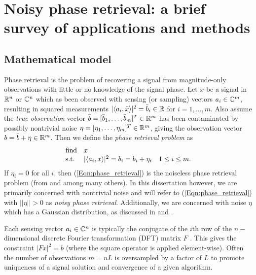 \chapter{Noisy phase retrieval: a brief survey of applications and methods} 	\label{Sec:phase_retrieval}


\section{Mathematical model}	\label{Subsec:phase_retrieval-math_model}



Phase retrieval is the problem of recovering a signal from magnitude-only observations with little or no knowledge of the signal phase.  Let $\bar{x}$ be a signal in ${\mathbb R}^n$ or ${\mathbb C}^n$ which as been observed with sensing (or sampling) vectors $a_i \in {\mathbb C}^m$, resulting in squared measurements $|\langle a_i, \bar{x} \rangle |^2 = \bar{b}_i \in {\mathbb R}$ for $i = 1, \ldots, m$.  Also assume the \textit{true observation} vector $\bar{b} = [\bar{b}_1, \ldots, \bar{b}_m]^T \in {\mathbb R}^m$ has been contaminated by possibly nontrivial noise $\eta = [\eta_1, \ldots, \eta_m]^T \in {\mathbb R}^m$, giving the observation vector $b = \bar{b} + \eta \in {\mathbb R}^m$.  Then we define the \textit{phase retrieval problem} as
\begin{equation} \label{Eqn:phase_retrieval}
\begin{array}{lll}
\textnormal{find}		&	x		\\
\textnormal{s.t.}				&	|\langle a_i, x \rangle|^2 = b_i = \bar{b}_i + \eta_i	&	1 \leq i \leq m.
\end{array}
\end{equation}
If $\eta_i = 0$ for all $i$, then (\ref{Eqn:phase_retrieval}) is the noiseless phase retrieval problem (from \cite{Fienup82} and  \cite{DBLP:journals/tit/CandesLS15} among many others).  In this dissertation however, we are primarily concerned with nontrivial noise and will refer to (\ref{Eqn:phase_retrieval}) with $||\eta|| > 0$ as \textit{noisy phase retrieval}.  Additionally, we are concerned with noise $\eta$ which has a Gaussian distribution, as discussed in \cite{DBLP:journals/siamis/CandesESV13} and \cite{DBLP:journals/siamsc/FriedlanderM16}.


Each sensing vector $a_i \in {\mathbb C}^n$ is typically the conjugate of the $i$th row of the $n-$dimensional discrete Fourier transformation (DFT) matrix $F$ \cite[Chapter 11]{bracewell1986fourier}.  This gives the constraint $|Fx|^2 = b$ (where the square operator is applied element-wise).  Often the number of observations $m = nL$ is oversampled by a factor of $L$ to promote uniqueness of a signal solution and convergence of a given algorithm.  


